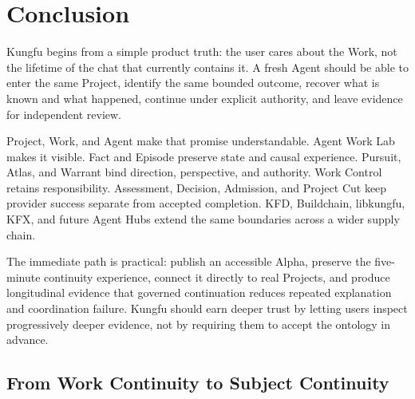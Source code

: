 \section{Conclusion}

Kungfu begins from a simple product truth: the user cares about the Work, not
the lifetime of the chat that currently contains it. A fresh Agent should be
able to enter the same Project, identify the same bounded outcome, recover what
is known and what happened, continue under explicit authority, and leave
evidence for independent review.

Project, Work, and Agent make that promise understandable. Agent Work Lab makes
it visible. Fact and Episode preserve state and causal experience. Pursuit,
Atlas, and Warrant bind direction, perspective, and authority. Work Control
retains responsibility. Assessment, Decision, Admission, and Project Cut keep
provider success separate from accepted completion. KFD, Buildchain,
libkungfu, KFX, and future Agent Hubs extend the same boundaries across a wider
supply chain.

The immediate path is practical: publish an accessible Alpha, preserve the
five-minute continuity experience, connect it directly to real Projects, and
produce longitudinal evidence that governed continuation reduces repeated
explanation and coordination failure. Kungfu should earn deeper trust by
letting users inspect progressively deeper evidence, not by requiring them to
accept the ontology in advance.

\subsection{From Work Continuity to Subject Continuity}

